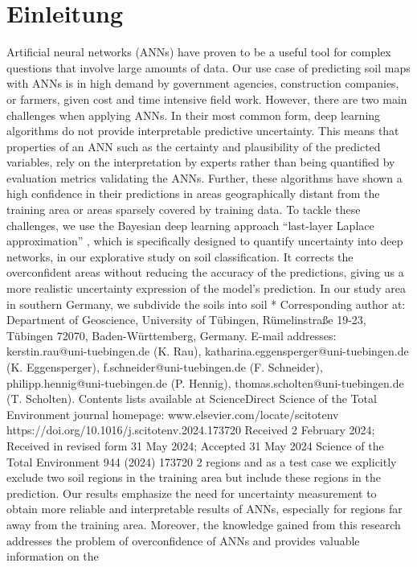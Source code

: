 \chapter{Einleitung}

Artificial neural networks (ANNs) have proven to be a useful tool for complex questions that involve large
amounts of data. Our use case of predicting soil maps with ANNs is in high demand by government agencies,
construction companies, or farmers, given cost and time intensive field work. However, there are two main
challenges when applying ANNs. In their most common form, deep learning algorithms do not provide interpretable
predictive uncertainty. This means that properties of an ANN such as the certainty and plausibility of the
predicted variables, rely on the interpretation by experts rather than being quantified by evaluation metrics
validating the ANNs. Further, these algorithms have shown a high confidence in their predictions in areas
geographically distant from the training area or areas sparsely covered by training data. To tackle these challenges,
we use the Bayesian deep learning approach “last-layer Laplace approximation”
, which is specifically
designed to quantify uncertainty into deep networks, in our explorative study on soil classification. It corrects the
overconfident areas without reducing the accuracy of the predictions, giving us a more realistic uncertainty
expression of the model’s prediction. In our study area in southern Germany, we subdivide the soils into soil
* Corresponding author at: Department of Geoscience, University of Tübingen, Rümelinstraße 19-23, Tübingen 72070, Baden-Württemberg, Germany.
E-mail addresses: kerstin.rau@uni-tuebingen.de (K. Rau), katharina.eggensperger@uni-tuebingen.de (K. Eggensperger), f.schneider@uni-tuebingen.de
(F. Schneider), philipp.hennig@uni-tuebingen.de (P. Hennig), thomas.scholten@uni-tuebingen.de (T. Scholten).
Contents lists available at ScienceDirect
Science of the Total Environment
journal homepage: www.elsevier.com/locate/scitotenv
https://doi.org/10.1016/j.scitotenv.2024.173720
Received 2 February 2024; Received in revised form 31 May 2024; Accepted 31 May 2024
Science of the Total Environment 944 (2024) 173720
2
regions and as a test case we explicitly exclude two soil regions in the training area but include these regions in
the prediction. Our results emphasize the need for uncertainty measurement to obtain more reliable and interpretable
results of ANNs, especially for regions far away from the training area. Moreover, the knowledge gained
from this research addresses the problem of overconfidence of ANNs and provides valuable information on the
